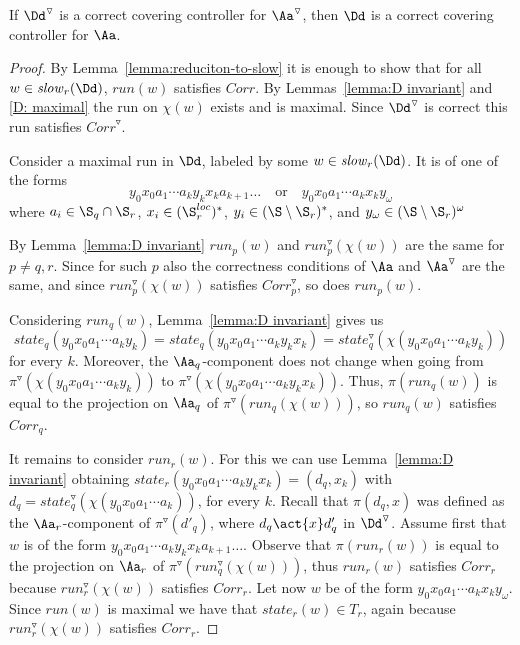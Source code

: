 \documentclass[10pt,a4paper]{article}
\newcommand{\run}{\mathit{run}}
\newcommand{\Cor}{\mathit{Corr}}
\newcommand{\red}[1]{#1^\triangledown}
\newcommand{\slow}{\mathit{slow}}
\newcommand{\state}{\mathit{state}}
\begin{document}
\begin{lemma}\label{lemma:D correct}
 If $\red\Dd$ is a correct covering controller for $\red\Aa$, then $\Dd$
  is a correct covering controller for $\Aa$.
\end{lemma}

\begin{proof}
  By Lemma~\ref{lemma:reduciton-to-slow} it is enough to show that 
  for all $w\in\slow_r(\Dd)$, $\run(w)$ satisfies $\Cor$.
  By Lemmas~\ref{lemma:D invariant} and \ref{D: maximal} the run on
  $\chi(w)$ exists and is 
  maximal. Since $\red\Dd$ is correct this run satisfies $\red\Cor$.

  Consider a maximal run in $\Dd$, labeled by some
  $w\in\slow_r(\Dd)$. It is of one of the forms
  \begin{equation*}
    y_0x_0a_1\cdots a_k y_k x_k a_{k+1}\dots\quad\text{or}\quad
    y_0x_0a_1\cdots a_k x_k y_\omega
  \end{equation*}
  where $a_i\in \S_q \cap \S_r$, $x_i\in (\S^{loc}_r)^*$, $y_i\in (\S
  \setminus \S_r)^*$, and $y_\omega\in (\S \setminus \S_r)^\omega$

  By Lemma~\ref{lemma:D invariant} $\run_p(w)$ and
  $\red\run_p(\chi(w))$ are the same for $p\not=q,r$. Since for such
  $p$ also the
  correctness conditions of $\Aa$ and $\red\Aa$ are the same, and since
  $\red\run_p(\chi(w))$ satisfies $\red\Cor_p$, so does
  $\run_p(w)$. 

  Considering $\run_q(w)$, Lemma~\ref{lemma:D invariant} gives us
  \[\state_q(y_0x_0a_1\cdots a_ky_k)=\state_q(y_0x_0a_1\cdots
  a_ky_kx_k)=\red\state_q(\chi(y_0x_0a_1\cdots a_ky_k))\]
 for every
  $k$. Moreover, the $\Aa_q$-component does not change when going from
  $\red\pi(\chi(y_0x_0a_1\cdots a_ky_k))$ to
  $\red\pi(\chi(y_0x_0a_1\cdots a_ky_kx_k))$. Thus,
  $\pi(\run_q(w))$ is equal to the projection on $\Aa_q$ of $\red\pi(\run_q(\chi(w)))$, so  $\run_q(w)$ satisfies
  $\Cor_q$. 

 
  It remains to consider $\run_r(w)$. For this we can use Lemma~\ref{lemma:D
    invariant} obtaining
 $\state_r(y_0x_0a_1 \cdots a_ky_kx_k)=(d_q,x_k)$ with
  $d_q=\red\state_q(\chi(y_0x_0a_1 \cdots a_k))$, for every
  $k$. Recall that $\pi(d_q,x)$ was defined as the $\Aa_r$-component
  of $\red\pi(d'_q)$, where $d_q \act{x} d'_q$ in $\red\Dd$. Assume
  first that $w$ is of the form $y_0x_0a_1\cdots a_k y_k x_k
  a_{k+1}\dots$. Observe that $\pi(\run_r(w))$ is equal to the
  projection on $\Aa_r$ of $\red\pi(\red\run_q(\chi(w)))$, thus
  $\run_r(w)$ satisfies $\Cor_r$ because $\red\run_r(\chi(w))$ satisfies
  $\Cor_r$. Let now $w$ be of the form $y_0x_0a_1\cdots a_k x_k
  y_\omega$. Since $\run(w)$ is maximal we have that $\state_r(w)\in
  T_r$, again because $\red\run_r(\chi(w))$ satisfies $\Cor_r$. 
\end{proof}
\end{document}
